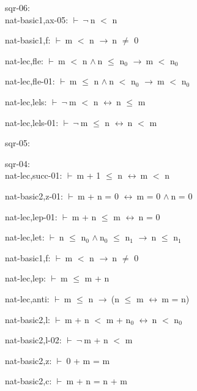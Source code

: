 \documentclass[a4paper]{article}
\newcommand{\Fol}{\mbox{$\vdash\ $}}
\newcommand{\Not}{\mbox{$\neg\ $}}
\newcommand{\And}{\mbox{$\wedge\ $}}
\newcommand{\Imp}{\mbox{$\rightarrow\ $}}
\newcommand{\Equiv}{\mbox{$\leftrightarrow\ $}}
\begin{document}
\bigskip

sqr-06:\\ nat-basic1,ax-05: 
 \Fol \Not n $<$ n



nat-basic1,f: 
 \Fol m $<$ n \Imp n $\neq$ 0



nat-lec,fle: 
 \Fol m $<$ n \And n $\le$ $\mbox{n}_{0}$ \Imp m $<$ $\mbox{n}_{0}$



nat-lec,fle-01: 
 \Fol m $\le$ n \And n $<$ $\mbox{n}_{0}$ \Imp m $<$ $\mbox{n}_{0}$



nat-lec,lels: 
 \Fol \Not m $<$ n \Equiv n $\le$ m



nat-lec,lels-01: 
 \Fol \Not m $\le$ n \Equiv n $<$ m



\bigskip

sqr-05:\\ 

\bigskip

sqr-04:\\ nat-lec,succ-01: 
 \Fol m + 1 $\le$ n \Equiv m $<$ n



nat-basic2,z-01: 
 \Fol m + n = 0 \Equiv m = 0 \And n = 0



nat-lec,lep-01: 
 \Fol m + n $\le$ m \Equiv n = 0



nat-lec,let: 
 \Fol n $\le$ $\mbox{n}_{0}$ \And $\mbox{n}_{0}$ $\le$ $\mbox{n}_{1}$ \Imp n $\le$ $\mbox{n}_{1}$



nat-basic1,f: 
 \Fol m $<$ n \Imp n $\neq$ 0



nat-lec,lep: 
 \Fol m $\le$ m + n



nat-lec,anti: 
 \Fol m $\le$ n \Imp (n $\le$ m \Equiv m = n)



nat-basic2,l: 
 \Fol m + n $<$ m + $\mbox{n}_{0}$ \Equiv n $<$ $\mbox{n}_{0}$



nat-basic2,l-02: 
 \Fol \Not m + n $<$ m



nat-basic2,z: 
 \Fol 0 + m = m



nat-basic2,c: 
 \Fol m + n = n + m
\end{document}
